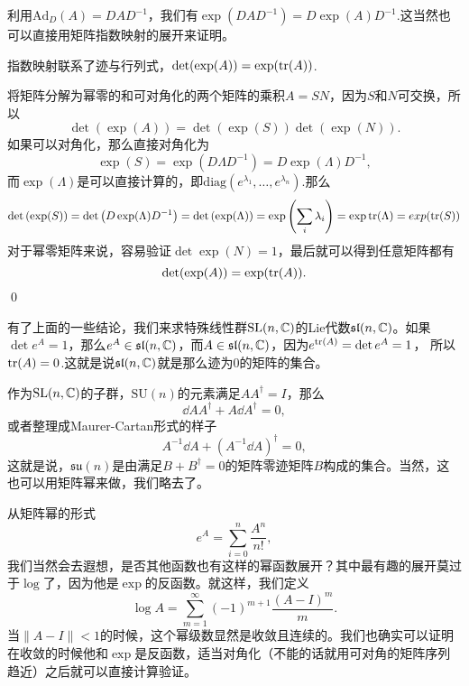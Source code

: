 \para 利用$\mathrm{Ad}_D(A)=DAD^{-1}$，我们有$\exp(DAD^{-1})=D\exp(A)D^{-1}$.这当然也可以直接用矩阵指数映射的展开来证明。

\pro 指数映射联系了迹与行列式，$\det(\exp(A))=\exp(\operatorname{tr}(A))$.

\proof 将矩阵分解为幂零的和可对角化的两个矩阵的乘积$A=SN$，因为$S$和$N$可交换，所以
\[
	\det \left(\exp(A)\right)=\det\left(\exp(S)\right)\det\left(\exp(N)\right).
\]
如果可以对角化，那么直接对角化为
\[
	\exp(S)=\exp(D\Lambda D^{-1})=D\exp(\Lambda) D^{-1},
\]
而$\exp(\Lambda)$是可以直接计算的，即$\mathrm{diag}\left(e^{\lambda_1},\dots,e^{\lambda_n}\right)$.那么
\[
	\det \left(\exp(S)\right)=\det \left(D\exp(\Lambda) D^{-1}\right)=\det \left(\exp(\Lambda)\right)=\exp\left(\sum_i \lambda_i\right)=\exp{\operatorname{tr}(\Lambda)}=exp(\operatorname{tr}(S))
\]
对于幂零矩阵来说，容易验证$\det \exp(N)=1$，最后就可以得到任意矩阵都有
\[
	\det(\exp(A))=\exp(\operatorname{tr}(A)).
\]
\qed

有了上面的一些结论，我们来求特殊线性群$\mathrm{SL}(n,\mathbb{C})$的Lie代数$\mathfrak{sl}(n,\mathbb{C})$。如果$\det e^A=1$，那么$e^A\in \mathfrak{sl}(n,\mathbb{C})$，而$A \in \mathfrak{sl}(n,\mathbb{C})$，因为$e^{\operatorname{tr}(A)}=\det e^A=1$，
所以$\operatorname{tr}(A)=0$.这就是说$\mathfrak{sl}(n,\mathbb{C})$就是那么迹为0的矩阵的集合。

作为$\mathrm{SL}(n,\mathbb{C})$的子群，$\mathrm{SU}(n)$的元素满足$AA^\dag=I$，那么
\[
	\dd A A^\dag+A\dd A^\dag=0,
\]
或者整理成Maurer-Cartan形式的样子
\[
	A^{-1}\dd A +(A^{-1}\dd A)^\dag=0,
\]
这就是说，$\mathfrak{su}(n)$是由满足$B+B^\dag=0$的矩阵零迹矩阵$B$构成的集合。当然，这也可以用矩阵幂来做，我们略去了。

从矩阵幂的形式
\[
	e^A=\sum_{i=0}^n\frac{A^n}{n!},
\]
我们当然会去遐想，是否其他函数也有这样的幂函数展开？其中最有趣的展开莫过于$\log$了，因为他是$\exp$的反函数。就这样，我们定义
\[
	\log A=\sum_{m=1}^\infty (-1)^{m+1}\frac{(A-I)^m}{m}.
\]
当$\|A-I\|<1$的时候，这个幂级数显然是收敛且连续的。我们也确实可以证明在收敛的时候他和$\exp$是反函数，适当对角化（不能的话就用可对角的矩阵序列趋近）之后就可以直接计算验证。


